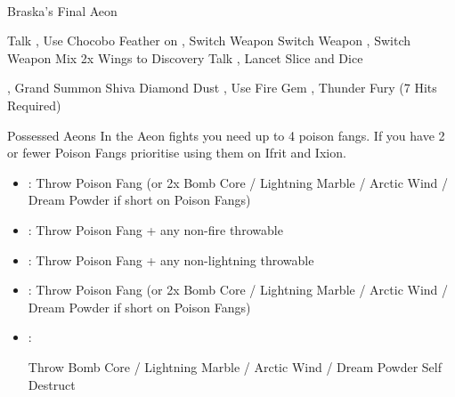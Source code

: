 \vfill\ \colbreak
\begin{battle}[180000]{Braska's Final Aeon}
	\begin{itemize}
		\tidusf Talk
		\switch{\yuna}{\rikku}, Use Chocobo Feather on \tidus
		\switch{\auron}{\yuna}, Switch Weapon
		\rikkuf Switch Weapon
		\switch{\yuna}{\lulu}, Switch Weapon
		\rikkuf Mix 2x Wings to Discovery
		\tidusf Talk
		\switch{\lulu}{\kimahri}, Lancet
		\tidusf Slice and Dice
		
		\vspace{\baselineskip}

		\switch{\rikku}{\yuna}, Grand Summon Shiva
		\shivaf Diamond Dust
		\switch{\kimahri}{\rikku}, Use Fire Gem
		\switch{\tidus}{\lulu}, Thunder Fury (7 Hits Required)
	\end{itemize}
\end{battle}
\colend
{}
\begin{battle}{Possessed  Aeons}
	In the Aeon fights you need up to 4 poison fangs. If you have 2 or fewer Poison Fangs prioritise using them on Ifrit and Ixion.
	\begin{itemize}
		\item \valefor : Throw Poison Fang (or 2x Bomb Core / Lightning Marble / Arctic Wind / Dream Powder if short on Poison Fangs)
		\item \ifrit : Throw Poison Fang + any non-fire throwable
		\item \ixion : Throw Poison Fang + any non-lightning throwable
		\item \shiva : Throw Poison Fang (or 2x Bomb Core / Lightning Marble / Arctic Wind / Dream Powder if short on Poison Fangs)
		\item \bahamut :
			\begin{itemize}
				\rikkuf Throw Bomb Core / Lightning Marble / Arctic Wind / Dream Powder
				\switch{\yuna}{\kimahri}
				\kimahrif Self Destruct
			\end{itemize}
	\end{itemize}
\end{battle}
